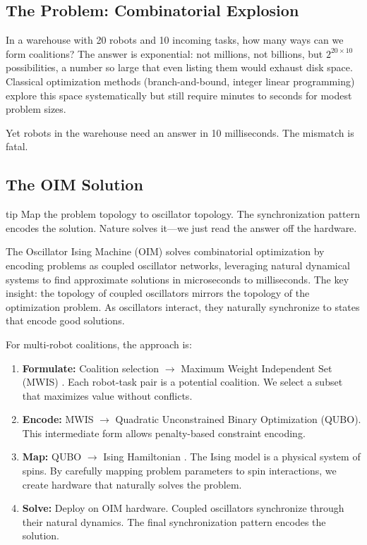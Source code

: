 \subsection{The Problem: Combinatorial Explosion}

In a warehouse with 20 robots and 10 incoming tasks, how many ways can we form coalitions? The answer is exponential: not millions, not billions, but $2^{20 \times 10}$ possibilities, a number so large that even listing them would exhaust disk space. Classical optimization methods (branch-and-bound, integer linear programming) explore this space systematically but still require minutes to seconds for modest problem sizes.

Yet robots in the warehouse need an answer in 10 milliseconds. The mismatch is fatal.

\subsection{The OIM Solution}

\begin{block}{tip}
Map the problem topology to oscillator topology. The synchronization pattern encodes the solution. Nature solves it—we just read the answer off the hardware.
\end{block}


The Oscillator Ising Machine (OIM) \cite{Wang2019} solves combinatorial optimization by encoding problems as coupled oscillator networks, leveraging natural dynamical systems to find approximate solutions in microseconds to milliseconds. The key insight: the topology of coupled oscillators mirrors the topology of the optimization problem. As oscillators interact, they naturally synchronize to states that encode good solutions.

For multi-robot coalitions, the approach is:
\begin{enumerate}
\item \textbf{Formulate:} Coalition selection $\to$ Maximum Weight Independent Set (MWIS) \cite{Kochenberger2014}. Each robot-task pair is a potential coalition. We select a subset that maximizes value without conflicts.

\item \textbf{Encode:} MWIS $\to$ Quadratic Unconstrained Binary Optimization (QUBO). This intermediate form allows penalty-based constraint encoding.

\item \textbf{Map:} QUBO $\to$ Ising Hamiltonian \cite{Lucas2014}. The Ising model is a physical system of spins. By carefully mapping problem parameters to spin interactions, we create hardware that naturally solves the problem.

\item \textbf{Solve:} Deploy on OIM hardware. Coupled oscillators synchronize through their natural dynamics. The final synchronization pattern encodes the solution.
\end{enumerate}

